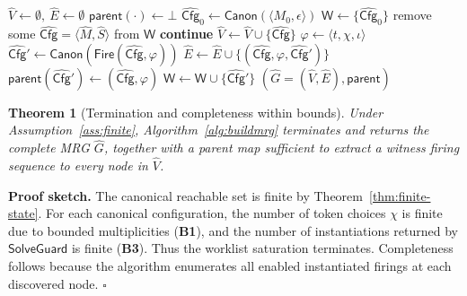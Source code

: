 \documentclass[sigconf]{acmart}
\newtheorem{theorem}{Theorem}
\begin{document}
\begin{algorithm}[t]
\caption{$\mathsf{BuildMRGWithParents}(\mathcal{N}_{\mathcal{C}})$}
\label{alg:buildmrg}
\begin{algorithmic}[1]
\STATE $\widehat{V}\gets \emptyset,\ \widehat{E}\gets \emptyset$
\STATE $\mathsf{parent}(\cdot)\gets \bot$
\STATE $\widehat{\mathsf{Cfg}}_0\gets \mathsf{Canon}(\langle M_0,\epsilon\rangle)$
\STATE $\mathsf{W}\gets \{\widehat{\mathsf{Cfg}}_0\}$
  \STATE remove some $\widehat{\mathsf{Cfg}}=\langle \widehat{M},\widehat{S}\rangle$ from $\mathsf{W}$
   \textbf{continue} \ENDIF
  \STATE $\widehat{V}\gets \widehat{V}\cup\{\widehat{\mathsf{Cfg}}\}$
        \STATE $\varphi \gets \langle t,\chi,\iota\rangle$
        \STATE $\widehat{\mathsf{Cfg}}'\gets \mathsf{Canon}(\mathsf{Fire}(\widehat{\mathsf{Cfg}},\varphi))$
        \STATE $\widehat{E}\gets \widehat{E}\cup\{(\widehat{\mathsf{Cfg}},\varphi,\widehat{\mathsf{Cfg}}')\}$
          \STATE $\mathsf{parent}(\widehat{\mathsf{Cfg}}')\gets (\widehat{\mathsf{Cfg}},\varphi)$
        \ENDIF
        \STATE $\mathsf{W}\gets \mathsf{W}\cup\{\widehat{\mathsf{Cfg}}'\}$
      \ENDFOR
    \ENDFOR
  \ENDFOR
\ENDWHILE
\RETURN $(\widehat{G}=(\widehat{V},\widehat{E}),\mathsf{parent})$
\end{algorithmic}
\end{algorithm}

\begin{theorem}[Termination and completeness within bounds]
\label{thm:mrg-term-comp}
Under Assumption~\ref{ass:finite}, Algorithm~\ref{alg:buildmrg} terminates and returns the complete MRG $\widehat{G}$,
together with a parent map sufficient to extract a witness firing sequence to every node in $\widehat{V}$.
\end{theorem}
\noindent\textbf{Proof sketch.}
The canonical reachable set is finite by Theorem~\ref{thm:finite-state}.
For each canonical configuration, the number of token choices $\chi$ is finite due to bounded multiplicities (\textbf{B1}),
and the number of instantiations returned by $\mathsf{SolveGuard}$ is finite (\textbf{B3}).
Thus the worklist saturation terminates.
Completeness follows because the algorithm enumerates all enabled instantiated firings at each discovered node. \hfill $\square$
\end{document}

